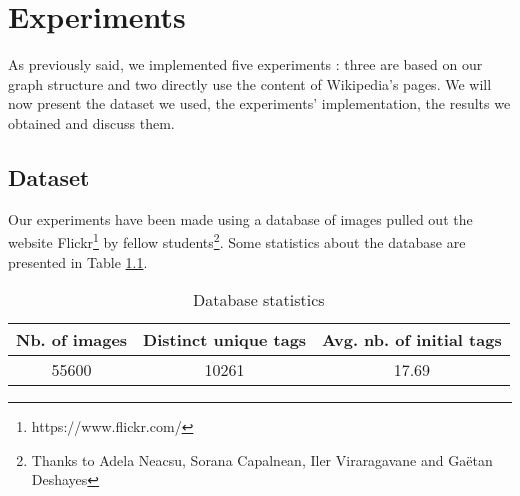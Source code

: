 
\chapter{Experiments} %

\label{chapter:Experiments} %

As previously said, we implemented five experiments : three are based on our graph structure and two directly use the content of Wikipedia's pages. We will now present the dataset we used, the experiments' implementation, the results we obtained and discuss them.

\section{Dataset} %
\label{sec:dataset}
Our experiments have been made using a database of images pulled out the website Flickr\footnote{https://www.flickr.com/} by fellow students\footnote{Thanks to Adela Neacsu, Sorana Capalnean, Iler Viraragavane and Gaëtan Deshayes}. Some statistics about the database are presented in Table \ref{table:db_stats}.\\
\begin{table}[!h]
\centering
\begin{tabular}{|c|c|c|}
\hline
{\bf Nb. of images} & {\bf Distinct unique tags} & {\bf Avg. nb. of initial tags} \\ \hline
55600               & 10261                      & 17.69                          \\ \hline
\end{tabular}
\caption{Database statistics}
\label{table:db_stats}
\end{table}

\newpage

